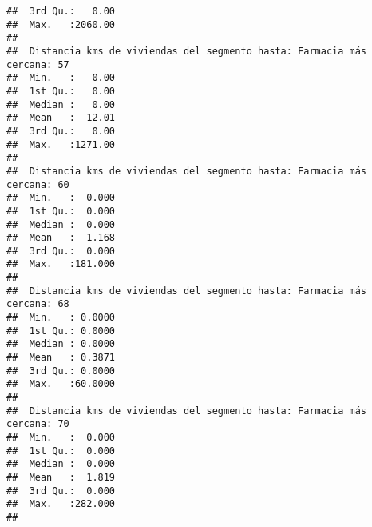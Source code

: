 \documentclass[11pt,]{article}
\begin{document}
\begin{verbatim}
##  3rd Qu.:   0.00                                                        
##  Max.   :2060.00                                                        
##                                                                         
##  Distancia kms de viviendas del segmento hasta: Farmacia más cercana: 57
##  Min.   :   0.00                                                        
##  1st Qu.:   0.00                                                        
##  Median :   0.00                                                        
##  Mean   :  12.01                                                        
##  3rd Qu.:   0.00                                                        
##  Max.   :1271.00                                                        
##                                                                         
##  Distancia kms de viviendas del segmento hasta: Farmacia más cercana: 60
##  Min.   :  0.000                                                        
##  1st Qu.:  0.000                                                        
##  Median :  0.000                                                        
##  Mean   :  1.168                                                        
##  3rd Qu.:  0.000                                                        
##  Max.   :181.000                                                        
##                                                                         
##  Distancia kms de viviendas del segmento hasta: Farmacia más cercana: 68
##  Min.   : 0.0000                                                        
##  1st Qu.: 0.0000                                                        
##  Median : 0.0000                                                        
##  Mean   : 0.3871                                                        
##  3rd Qu.: 0.0000                                                        
##  Max.   :60.0000                                                        
##                                                                         
##  Distancia kms de viviendas del segmento hasta: Farmacia más cercana: 70
##  Min.   :  0.000                                                        
##  1st Qu.:  0.000                                                        
##  Median :  0.000                                                        
##  Mean   :  1.819                                                        
##  3rd Qu.:  0.000                                                        
##  Max.   :282.000                                                        
##                                                                         

\end{verbatim}
\end{document}
